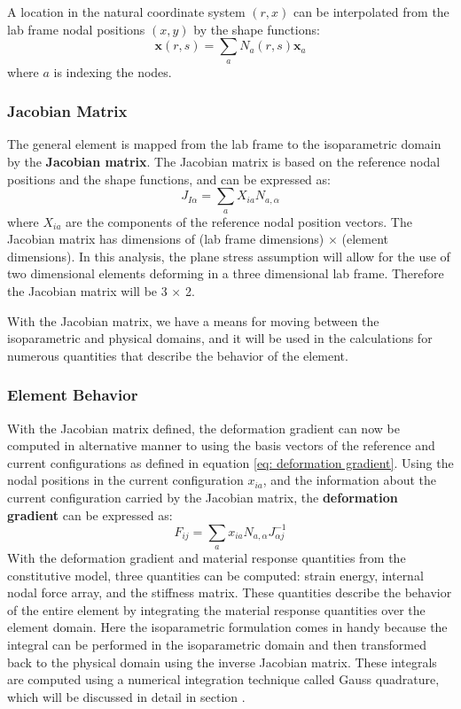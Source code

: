 \documentclass[]{spie}  %
\begin{document}
A location in the natural coordinate system $(r,x)$ can be interpolated from the lab frame nodal positions $(x,y)$ by the shape functions:
\begin{equation}
\label{eq: shape function mapping}
\bm{x}(r,s) = \sum\limits_{a} N_a(r,s) \bm{x}_a
\end{equation}
where $a$ is indexing the nodes. 

\subsubsection{Jacobian Matrix}
The general element is mapped from the lab frame to the isoparametric domain by the \textbf{Jacobian matrix}. The Jacobian matrix is based on the reference nodal positions and the shape functions, and can be expressed as:
\begin{equation}
\label{eq: Jacobian matrix}
J_{I\alpha} = \sum\limits_{a} X_{ia} N_{a,\alpha}
\end{equation}
where $X_{ia}$ are the components of the reference nodal position vectors. The Jacobian matrix has dimensions of (lab frame dimensions) $\times$ (element dimensions). In this analysis, the plane stress assumption will allow for the use of two dimensional elements deforming in a three dimensional lab frame. Therefore the Jacobian matrix will be 3 $\times$ 2. 

With the Jacobian matrix, we have a means for moving between the isoparametric and physical domains, and it will be used in the calculations for numerous quantities that describe the behavior of the element.

\subsubsection{Element Behavior}
With the Jacobian matrix defined, the deformation gradient can now be computed in alternative manner to using the basis vectors of the reference and current configurations as defined in equation \ref{eq: deformation gradient}. Using the nodal positions in the current configuration $x_{ia}$, and the information about the current configuration carried by the Jacobian matrix, the \textbf{deformation gradient} can be expressed as:
\begin{equation}
\label{eq: deformation gradient using Jacobian matrix}
F_{ij} = \sum\limits_{a} x_{ia} N_{a,\alpha} J_{\alpha j}^{-1}
\end{equation}
With the deformation gradient and material response quantities from the constitutive model, three quantities can be computed: strain energy, internal nodal force array, and the stiffness matrix. These quantities describe the behavior of the entire element by integrating the material response quantities over the element domain. Here the isoparametric formulation comes in handy because the integral can be performed in the isoparametric domain and then transformed back to the physical domain using the inverse Jacobian matrix. These integrals are computed using a numerical integration technique called Gauss quadrature, which will be discussed in detail in section \textit{}. 
\end{document}
